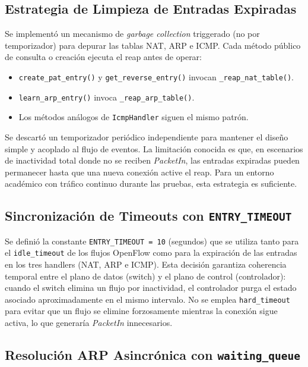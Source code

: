 \documentclass[11pt, a4paper]{article}
\begin{document}
\subsection{Estrategia de Limpieza de Entradas Expiradas}
\label{subsec:reap}

Se implementó un mecanismo de \textit{garbage collection} triggerado (no por temporizador) para depurar las tablas NAT, ARP e ICMP. Cada método público de consulta o creación ejecuta el reap antes de operar:

\begin{itemize}
    \item \texttt{create\_pat\_entry()} y \texttt{get\_reverse\_entry()} invocan \texttt{\_reap\_nat\_table()}.
    \item \texttt{learn\_arp\_entry()} invoca \texttt{\_reap\_arp\_table()}.
    \item Los métodos análogos de \texttt{IcmpHandler} siguen el mismo patrón.
\end{itemize}

Se descartó un temporizador periódico independiente para mantener el diseño simple y acoplado al flujo de eventos. La limitación conocida es que, en escenarios de inactividad total donde no se reciben \textit{PacketIn}, las entradas expiradas pueden permanecer hasta que una nueva conexión active el reap. Para un entorno académico con tráfico continuo durante las pruebas, esta estrategia es suficiente.

\subsection{Sincronización de Timeouts con \texttt{ENTRY\_TIMEOUT}}
\label{subsec:entry_timeout}

Se definió la constante \texttt{ENTRY\_TIMEOUT = 10} (segundos) que se utiliza tanto para el \texttt{idle\_timeout} de los flujos OpenFlow como para la expiración de las entradas en los tres handlers (NAT, ARP e ICMP). Esta decisión garantiza coherencia temporal entre el plano de datos (switch) y el plano de control (controlador): cuando el switch elimina un flujo por inactividad, el controlador purga el estado asociado aproximadamente en el mismo intervalo. No se emplea \texttt{hard\_timeout} para evitar que un flujo se elimine forzosamente mientras la conexión sigue activa, lo que generaría \textit{PacketIn} innecesarios.

\subsection{Resolución ARP Asincrónica con \texttt{waiting\_queue}}
\label{subsec:arp_async}
\end{document}
